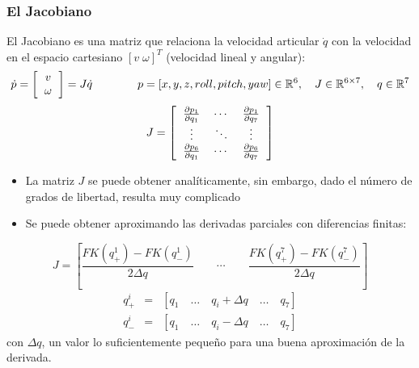\begin{frame}\frametitle{El Jacobiano}
  El Jacobiano es una matriz que relaciona la velocidad articular $\dot{q}$ con la velocidad en el espacio cartesiano $[v\;\omega]^T$ (velocidad lineal y angular):
  \[\dot{p} = \left[\begin{tabular}{c}$v$\\$\omega$\end{tabular}\right] = J \dot{q}
  \qquad\qquad p = [x,y,z,roll, pitch, yaw] \in \mathbb{R}^6, \quad J\in \mathbb{R}^{6\times 7},\quad q\in \mathbb{R}^7\]
  \[J = \left[ \begin{tabular}{ccc}
      $\frac{\partial p_1}{\partial q_1}$ & $\cdots$ & $\frac{\partial p_1}{\partial q_7}$\\
      $\vdots$ & $\ddots$ & $\vdots$ \\
      $\frac{\partial p_6}{\partial q_1}$ & $\cdots$ & $\frac{\partial p_6}{\partial q_7}$\\
    \end{tabular} \right]\]
  \begin{itemize}
  \item La matriz $J$ se puede obtener analíticamente, sin embargo, dado el número de grados de libertad, resulta muy complicado
  \item Se puede obtener aproximando las derivadas parciales con diferencias finitas:
  \end{itemize}
  \[J = \left[\frac{FK(q^1_{+}) -  FK(q^1_{-})}{2\Delta q} \qquad \cdots \qquad \frac{FK(q^7_{+}) -  FK(q^7_{-})}{2\Delta q}\right]\]
  \begin{eqnarray*}
    q^i_+ &=& [q_1\quad \dots \quad q_i + \Delta q \quad \dots \quad q_7]\\
    q^i_- &=& [q_1\quad \dots \quad q_i - \Delta q \quad \dots \quad q_7]
  \end{eqnarray*}
  con $\Delta q$, un valor lo suficientemente pequeño para una buena aproximación de la derivada. 
\end{frame}

